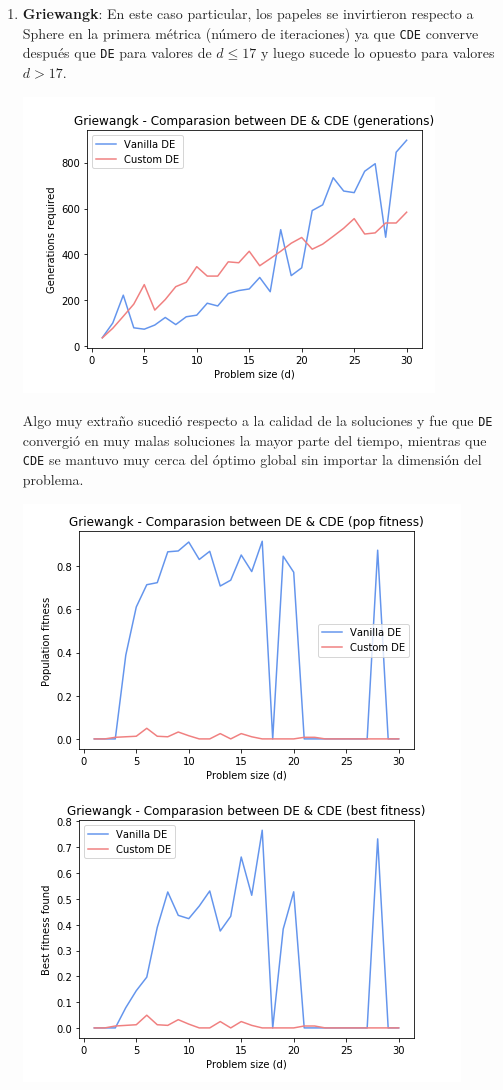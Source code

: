 \documentclass[10pt, letterpaper]{article}
\theoremstyle{definition}
\begin{document}
\begin{enumerate}
\begin{enumerate}
        \item \textbf{Griewangk}: En este caso particular, los papeles se
              invirtieron respecto a Sphere en la primera métrica (número de iteraciones) ya que
              \texttt{CDE} converve después que \texttt{DE} para valores de
              $d\leq 17$ y luego sucede lo opuesto para valores $d>17$.
              \begin{center}
                \includegraphics[scale=0.6]{assets/griewangk-gen.png}
              \end{center}
              Algo muy extraño sucedió respecto a la calidad de la soluciones
              y fue que \texttt{DE} convergió en muy malas soluciones la mayor
              parte del tiempo, mientras que \texttt{CDE} se mantuvo muy
              cerca del óptimo global sin importar la dimensión del problema.
              \begin{center}
                \includegraphics[scale=0.6]{assets/griewangk-fitness.png}

\end{center}
\end{enumerate}
\end{enumerate}
\end{document}
